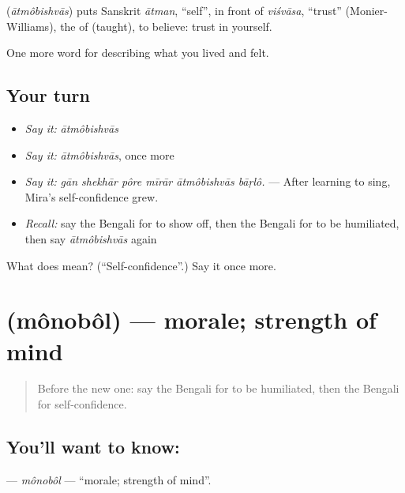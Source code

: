 \begin{cousinweb}
\textbf{} (\emph{ātmôbishvās}) puts Sanskrit \emph{ātman}, \textquotedblleft{}self\textquotedblright{}, in front of \emph{viśvāsa}, \textquotedblleft{}trust\textquotedblright{} (Monier-Williams), the  of   (taught), to believe: trust in yourself.
\end{cousinweb}

\begin{grammarlens}[title={What you've built}]
One more word for describing what you lived and felt.
\end{grammarlens}

\subsection*{Your turn}
\begin{itemize}
\raggedright
  \item \emph{Say it:} \emph{ātmôbishvās}
  \item \emph{Say it:} \emph{ātmôbishvās}, once more
  \item \emph{Say it:} \emph{gān shekhār pôre mīrār ātmôbishvās bāṛlô.} — After learning to sing, Mira's self-confidence grew.
  \item \emph{Recall:} say the Bengali for to show off, then the Bengali for to be humiliated, then say \emph{ātmôbishvās} again
\end{itemize}

\begin{tcolorbox}[breakable,colback=teal!4,colframe=teal!35!black,title={Before you move on}]
What does  mean? (\textquotedblleft{}Self-confidence\textquotedblright{}.) Say it once more.
\end{tcolorbox}
\section[\texorpdfstring{\bn{মনোবল} (mônobôl)}{মনোবল (mônobôl)}]{ (mônobôl) — morale; strength of mind}

\label{lesson:BN-C453-monobol}



\begin{quote}
Before the new one: say the Bengali for to be humiliated, then the Bengali for self-confidence.
\end{quote}

\subsection*{You'll want to know: }
\textbf{} — \emph{mônobôl} — \textquotedblleft{}morale; strength of mind\textquotedblright{}.

